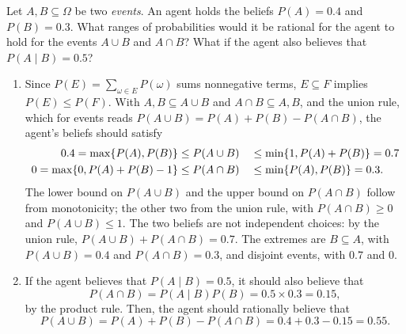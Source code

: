 \documentclass[11pt, a4paper]{exam}
\begin{document}
\begin{exercises}[1, 2, 3, 5]


Let $A, B \subseteq \Omega$ be two \emph{events}. An agent holds the beliefs $P(A) = 0.4$ and $P(B) = 0.3$. What ranges of probabilities would it be rational for the agent to hold for the events $A \cup B$ and $A \cap B$? What if the agent also believes that $P(A \mid B) = 0.5$?

\begin{solution}
    \begin{enumerate}
        \item Since $P(E) = \sum_{\omega \in E} P(\omega)$ sums nonnegative terms, $E \subseteq F$ implies $P(E) \leq P(F)$. With $A, B \subseteq A \cup B$ and $A \cap B \subseteq A, B$, and the union rule, which for events reads $P(A \cup B) = P(A) + P(B) - P(A \cap B)$, the agent's beliefs should satisfy
        \begin{alignat*}{2}
            0.4 = \max \{P(A), P(B)\} & \leq P(A \cup B) && \leq \min \{1, P(A) + P(B)\} = 0.7 \\
            0 = \max \{0, P(A) + P(B) - 1\} & \leq P(A \cap B) && \leq \min \{P(A), P(B)\} = 0.3 .
        \end{alignat*}
        The lower bound on $P(A \cup B)$ and the upper bound on $P(A \cap B)$ follow from monotonicity; the other two from the union rule, with $P(A \cap B) \geq 0$ and $P(A \cup B) \leq 1$.
        The two beliefs are not independent choices: by the union rule, $P(A \cup B) + P(A \cap B) = 0.7$. The extremes are $B \subseteq A$, with $P(A \cup B) = 0.4$ and $P(A \cap B) = 0.3$, and disjoint events, with $0.7$ and $0$.

        \item If the agent believes that $P(A \mid B) = 0.5$, it should also believe that
        \begin{equation*}
            P(A \cap B) = P(A \mid B) P(B) = 0.5 \times 0.3 = 0.15,
        \end{equation*}
        by the product rule. Then, the agent should rationally believe that
        \begin{equation*}
            P(A \cup B) = P(A) + P(B) - P(A \cap B) = 0.4 + 0.3 - 0.15 = 0.55.
        \end{equation*}
    \end{enumerate}
\end{solution}



\end{exercises}
\end{document}
